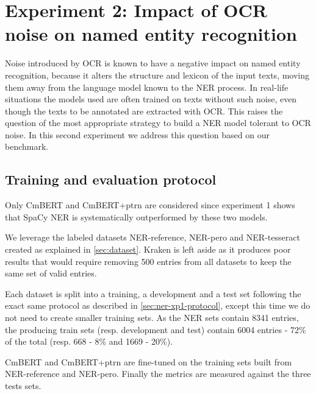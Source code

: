 \section{Experiment 2: Impact of OCR noise on named entity recognition}
\label{sec:ner-xp2}
Noise introduced by OCR is known to have a negative impact on named entity recognition, because it alters the structure and lexicon of the input texts, moving them away from the language model known to the NER process.
In real-life situations the models used are often trained on texts without such noise, even though the texts to be annotated are extracted with OCR.
This raises the question of the most appropriate strategy to build a NER model tolerant to OCR noise.
In this second experiment we address this question based on our benchmark.


\subsection{Training and evaluation protocol}
Only CmBERT and CmBERT+ptrn are considered since experiment 1 shows that SpaCy NER is systematically outperformed by these two models.

We leverage the labeled datasets NER-reference, NER-pero and NER-tesseract created as explained in \cref{sec:dataset}.
Kraken is left aside as it produces poor results that would require removing 500 entries from all datasets to keep the same set of valid entries.

Each dataset is split into a training, a development and a test set following the exact same protocol as described in \cref{sec:ner-xp1-protocol}, except this time we do not need to create smaller training sets.
As the NER sets contain 8341 entries, the producing train sets (resp. development and test) contain 6004 entries - 72\% of the total (resp. 668 - 8\% and 1669 - 20\%).    

CmBERT and CmBERT+ptrn are fine-tuned on the training sets built from NER-reference and NER-pero.
Finally the metrics are measured against the three tests sets.





